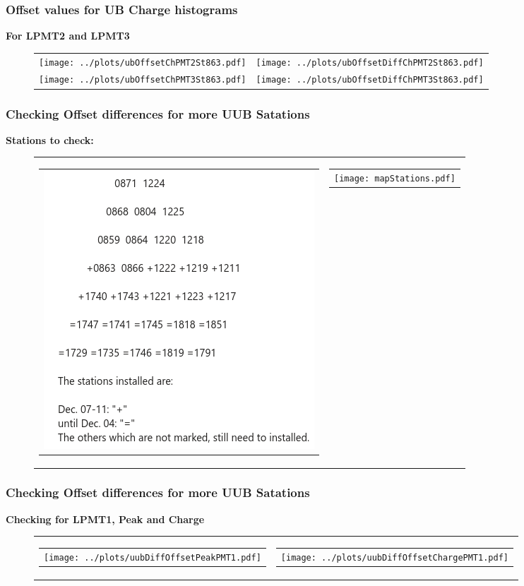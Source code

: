 \documentclass[aspectratio=169]{beamer}
\begin{document}
			
\begin{frame}
	\frametitle{Offset values for UB Charge histograms}
	{\bf For LPMT2 and LPMT3}
	\begin{figure}
		\centering
		\begin{tabularx}{\textwidth}{CC}
			\texttt{[image: ../plots/ubOffsetChPMT2St863.pdf]}
			&
			\texttt{[image: ../plots/ubOffsetDiffChPMT2St863.pdf]}
			\\
			\texttt{[image: ../plots/ubOffsetChPMT3St863.pdf]}
			&
			\texttt{[image: ../plots/ubOffsetDiffChPMT3St863.pdf]}
		\end{tabularx}
	\end{figure}
\end{frame}


\begin{frame}
	\frametitle{Checking Offset differences for more UUB Satations}
	{\bf Stations to check:}
	\begin{figure}
		\centering
		\begin{tabularx}{\textwidth}{CC}
			\begin{tabular}{l}
				\includegraphics[width=.35\textwidth]{listStations.png}
			\end{tabular}
			&
			\begin{tabular}{l}
				\texttt{[image: mapStations.pdf]}
			\end{tabular}
		\end{tabularx}
	\end{figure}
\end{frame}


\begin{frame}
	\frametitle{Checking Offset differences for more UUB Satations}
	{\bf Checking for LPMT1, Peak and Charge}
	\begin{figure}
		\centering
		\begin{tabularx}{\textwidth}{CC}
			\begin{tabular}{l}
				\texttt{[image: ../plots/uubDiffOffsetPeakPMT1.pdf]}
			\end{tabular}
			&
			\begin{tabular}{l}
				\texttt{[image: ../plots/uubDiffOffsetChargePMT1.pdf]}
			\end{tabular}
		\end{tabularx}
	\end{figure}
\end{frame}
\end{document}
